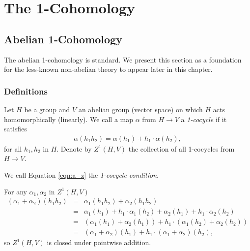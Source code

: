 
\chapter{The 1-Cohomology}
\label{Chapter3}

\section{Abelian 1-Cohomology}
The abelian 1-cohomology is standard. We present this section as a foundation for the less-known non-abelian theory to appear later in this chapter.	
\subsection{Definitions}
Let $H$ be a group and $V$ an abelian group (vector space) on which $H$ acts homomorphically (linearly). We call a map $\alpha$ from $H\rightarrow V$ a  \emph{1-cocycle} if it satisfies
\begin{eqnarray}
  \alpha(h_1h_2) = \alpha(h_1) + h_1\cdot\alpha(h_2),
  \label{eqn:a_z}
\end{eqnarray}
for all $h_1, h_2$ in $H$. Denote by $Z^1\left( H, V \right)$ the collection of all 1-cocycles from $H\rightarrow V$.

We call Equation \ref{eqn:a_z} the \emph{1-cocycle condition}.

For any $\alpha_1, \alpha_2$ in $Z^1\left(H, V\right)$
\begin{eqnarray*}
	\left(\alpha_1 + \alpha_2\right)(h_1h_2) &=& \alpha_1(h_1h_2) +  \alpha_2(h_1h_2) \\
	&=& \alpha_1(h_1) + h_1\cdot\alpha_1(h_2) +  \alpha_2(h_1) + h_1\cdot\alpha_2(h_2)\\
	&=& \left( \alpha_1(h_1) + \alpha_2(h_1) \right) + h_1\cdot\left(\alpha_1(h_2) + \alpha_2(h_2)\right) \\
	&=& \left(\alpha_1+\alpha_2\right)(h_1) + h_1\cdot\left(\alpha_1 + \alpha_2\right)(h_2),
\end{eqnarray*}
so $Z^1(H, V)$ is closed under pointwise addition.

